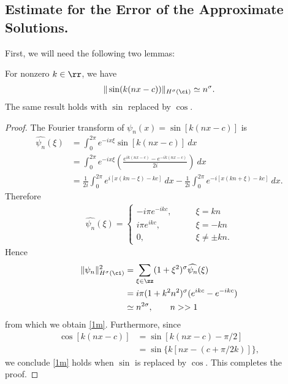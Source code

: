 \subsection{Estimate for the  Error of the Approximate Solutions.}
%
%
First, we will need the following two lemmas:
%
%
%
	 \begin{proposition}
		 \label{1n}
		 For nonzero $k \in \rr$, we have
		 \begin{equation}
			 \begin{split}
				 \|\sin(k(nx-c))\|_{H^\sigma(\ci)} \simeq n^\sigma.
				 \label{1m}
			 \end{split}
		 \end{equation}
		The same result holds with $\sin$ replaced by $\cos$.
	\end{proposition}
    \begin{proof} The Fourier transform of $\psi_n(x) = \sin[k(nx-c)]$
		is
		\begin{equation*}
			\begin{split}
				\widehat{\psi_n}(\xi)
				& = \int_0^{2\pi} e^{-ix \xi} \sin [k(nx-c)]
				\ dx
				\\
				& = \int_0^{2\pi} e^{-ix \xi} \left( \frac{e^{ik(nx-c)} -
				e^{-ik(nx-c)}}{2i} \right) \ dx
				\\
				& = \frac{1}{2i} \int_0^{2\pi} e^{i[x(kn- \xi)-kc]} \ dx
				- \frac{1}{2i}\int_0^{2\pi} e^{-i[x(kn+\xi) - kc]} \ dx.
			\end{split}
		\end{equation*}
		Therefore
		\begin{equation*}
			\begin{split}
				\widehat{\psi_n}(\xi) =
				\begin{cases}
					- i \pi e^{-ikc}, \qquad & \xi = kn\\
					i \pi e^{ikc}, \qquad & \xi = -kn\\
					0,  \qquad & \xi \neq \pm kn.
				\end{cases}
			\end{split}
		\end{equation*}
		Hence
		\begin{equation*}
			\begin{split}
				\|\psi_n\|_{H^\sigma(\ci)}^2
				& = \sum_{\xi \in \zz}
				(1+\xi^2)^{\sigma} \widehat{\psi_n}(\xi) 
				\\
				& = i \pi (1+k^2 n^2)^{\sigma} (e^{ikc} - e^{-ikc})
				\\
				& \simeq n^{2 \sigma}, \qquad n>>1
			\end{split}
		\end{equation*}
		from which we obtain \eqref{1m}. Furthermore, since
		\begin{equation*}
			\begin{split}
				\cos[k(nx-c)]
				&= \sin[k(nx-c)- \pi/2] \\
				& = \sin\{k[nx - (c + \pi/2k)]\},
			\end{split}
		\end{equation*}
		we conclude \eqref{1m} holds when $\sin$ is replaced by $\cos$. This
    completes the proof. 
  \end{proof}
